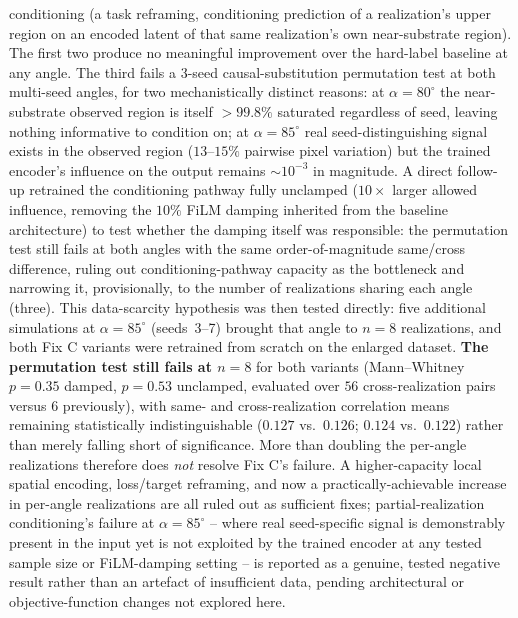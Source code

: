 \documentclass[aip,amsmath,amssymb,reprint]{revtex4-1}
\renewcommand{\ang}{\ensuremath{\alpha}} %
\begin{document}
\begin{itemize}
    conditioning (a task reframing, conditioning prediction of a
    realization's upper region on an encoded latent of that same
    realization's own near-substrate region). The first two produce
    no meaningful improvement over the hard-label baseline at any
    angle. The third fails a 3-seed causal-substitution permutation
    test at both multi-seed angles, for two mechanistically
    distinct reasons: at $\ang=80^{\circ}$ the near-substrate observed
    region is itself $>99.8\%$ saturated regardless of seed, leaving
    nothing informative to condition on; at $\ang=85^{\circ}$ real
    seed-distinguishing signal exists in the observed region
    ($13$--$15\%$ pairwise pixel variation) but the trained encoder's
    influence on the output remains $\sim10^{-3}$ in magnitude. A
    direct follow-up retrained the conditioning pathway fully
    unclamped ($10\times$ larger allowed influence, removing the
    $10\%$ FiLM damping inherited from the baseline architecture) to
    test whether the damping itself was responsible: the permutation
    test still fails at both angles with the same order-of-magnitude
    same/cross difference, ruling out conditioning-pathway capacity
    as the bottleneck and narrowing it, provisionally, to the number
    of realizations sharing each angle (three). This data-scarcity
    hypothesis was then tested directly: five additional simulations
    at $\ang=85^{\circ}$ (seeds~3--7) brought that angle to $n=8$
    realizations, and both Fix C variants were retrained from
    scratch on the enlarged dataset. \textbf{The permutation test
    still fails at $n=8$} for both variants (Mann--Whitney $p=0.35$
    damped, $p=0.53$ unclamped, evaluated over $56$ cross-realization
    pairs versus $6$ previously), with same- and cross-realization
    correlation means remaining statistically indistinguishable
    ($0.127$ vs.\ $0.126$; $0.124$ vs.\ $0.122$) rather than merely
    falling short of significance. More than doubling the per-angle
    realizations therefore does \emph{not} resolve Fix C's failure.
    A higher-capacity local spatial encoding, loss/target reframing, and now a
    practically-achievable increase in per-angle realizations are
    all ruled out as sufficient fixes; partial-realization
    conditioning's failure at $\ang=85^{\circ}$ -- where real seed-specific
    signal is demonstrably present in the input yet is not exploited
    by the trained encoder at any tested sample size or
    FiLM-damping setting -- is reported as a genuine, tested negative
    result rather than an artefact of insufficient data, pending
    architectural or objective-function changes not explored here.
\end{itemize}
\end{document}
